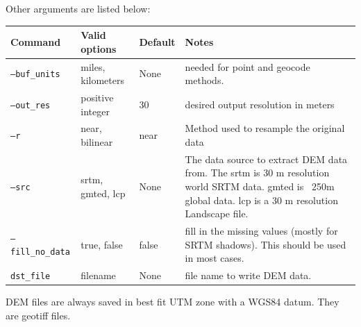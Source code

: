 \documentclass[12pt,oneside,final]{article}
\begin{document}
\noindent
Other arguments are listed below:
\medskip
\noindent
\begin{center}
\begin{tabular}{| l | l | l | p{2.75in} |}
    \hline
    Command & Valid options & Default & Notes \\ \hline
    \texttt{--buf\_units} & miles, kilometers & None & needed for point 
                                                       and geocode methods.
                                                       \\ \hline
    \texttt{--out\_res} & positive integer & 30 & desired output resolution in
                                                  meters \\ \hline
    \texttt{--r} & near, bilinear & near & Method used to resample the original
                                           data \\ \hline
    \texttt{--src} & srtm, gmted, lcp & None & The data source to extract DEM
                                               data from.  The srtm is 30 m resolution world
                                               SRTM data.
                                               gmted is ~250m global data. lcp is a 30 m resolution Landscape file.
                                               \\ \hline
    \texttt{--fill\_no\_data} & true, false & false & fill in the missing values
                                                   (mostly for SRTM shadows).
                                                   This should be used in most
                                                   cases. \\ \hline
    \texttt{dst\_file} & filename & None & file name to write DEM data. \\
                                           \hline
\end{tabular}
\end{center}
DEM files are always saved in best fit UTM zone with a WGS84 datum.  They are geotiff files.
\end{document}
